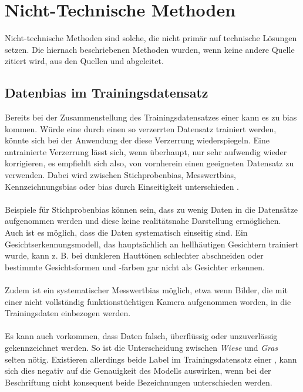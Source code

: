 \documentclass[hidelinks,12pt]{report}
\begin{document}
\section{Nicht-Technische Methoden}
Nicht-technische Methoden sind solche, die nicht primär auf technische Lösungen setzen. Die hiernach beschriebenen Methoden wurden, wenn keine andere Quelle zitiert wird, aus den Quellen \cite{UNESCO} und \cite{EUCommision} abgeleitet. 
\\
\subsection{Daten\gls{bias} im Trainingsdatensatz}
Bereits bei der Zusammenstellung des Trainingsdatensatzes einer  kann es zu \Gls{bias}  kommen. Würde eine  durch einen so verzerrten Datensatz trainiert werden, könnte sich bei der Anwendung der  diese Verzerrung wiederspiegeln. Eine antrainierte Verzerrung lässt sich, wenn überhaupt, nur sehr aufwendig wieder korrigieren, es empfiehlt sich also, von vornherein einen geeigneten Datensatz zu verwenden. Dabei wird zwischen Stichproben\gls{bias}, Messwert\gls{bias}, Kennzeichnungs\gls{bias} oder \Gls{bias} durch Einseitigkeit unterschieden \cite[S. 48ff.]{Srinivasan}.
\\\\
Beispiele für Stichproben\gls{bias} können sein, dass zu wenig Daten in die Datensätze aufgenommen werden und diese keine realitätsnahe Darstellung ermöglichen. Auch ist es möglich, dass die Daten systematisch einseitig sind. Ein Gesichtserkennungsmodell, das hauptsächlich an hellhäutigen Gesichtern trainiert wurde, kann z. B. bei dunkleren Hauttönen schlechter abschneiden oder bestimmte Gesichtsformen und -farben gar nicht als Gesichter erkennen.
\\\\
Zudem ist ein systematischer Messwert\gls{bias} möglich, etwa wenn Bilder, die mit einer nicht vollständig funktionstüchtigen Kamera aufgenommen worden, in die Trainingsdaten einbezogen werden.
\\\\
Es kann auch vorkommen, dass Daten falsch, überflüssig oder unzuverlässig gekennzeichnet werden. So ist die Unterscheidung zwischen \textit{Wiese} und \textit{Gras} selten nötig. Existieren allerdings beide Label im Trainingsdatensatz einer , kann sich dies negativ auf die Genauigkeit des Modells auswirken, wenn bei der Beschriftung nicht konsequent beide Bezeichnungen unterschieden werden\cite[S. 48ff.]{Srinivasan}. 
\end{document}
